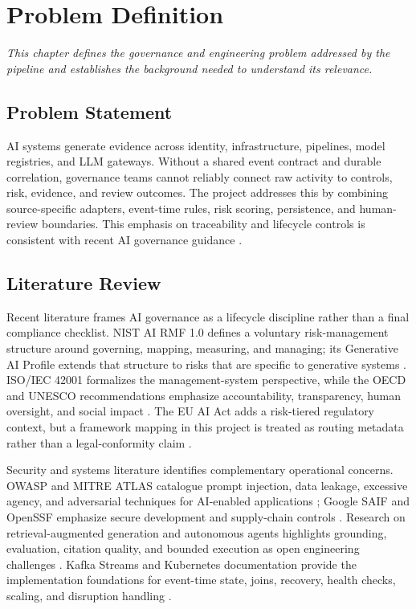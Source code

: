 \documentclass[12pt,oneside]{report}
\begin{document}
\chapter{Problem Definition}
\noindent\textit{This chapter defines the governance and engineering problem addressed by the pipeline and establishes the background needed to understand its relevance.}\par
\section{Problem Statement}
AI systems generate evidence across identity, infrastructure, pipelines, model registries, and LLM gateways. Without a shared event contract and durable correlation, governance teams cannot reliably connect raw activity to controls, risk, evidence, and review outcomes. The project addresses this by combining source-specific adapters, event-time rules, risk scoring, persistence, and human-review boundaries. This emphasis on traceability and lifecycle controls is consistent with recent AI governance guidance \cite{nist2023,iso42001,euaiact2024,owasllm2025}.
\section{Literature Review}
Recent literature frames AI governance as a lifecycle discipline rather than a final compliance checklist. NIST AI RMF 1.0 defines a voluntary risk-management structure around governing, mapping, measuring, and managing; its Generative AI Profile extends that structure to risks that are specific to generative systems \cite{nist2023,nistgenai2024}. ISO/IEC 42001 formalizes the management-system perspective, while the OECD and UNESCO recommendations emphasize accountability, transparency, human oversight, and social impact \cite{iso42001,oecd2024,unesco2021}. The EU AI Act adds a risk-tiered regulatory context, but a framework mapping in this project is treated as routing metadata rather than a legal-conformity claim \cite{euaiact2024}.

Security and systems literature identifies complementary operational concerns. OWASP and MITRE ATLAS catalogue prompt injection, data leakage, excessive agency, and adversarial techniques for AI-enabled applications \cite{owasllm2025,mitreatlas2024}; Google SAIF and OpenSSF emphasize secure development and supply-chain controls \cite{google2023,openssf2024}. Research on retrieval-augmented generation and autonomous agents highlights grounding, evaluation, citation quality, and bounded execution as open engineering challenges \cite{ragsurvey2024,agentsurvey2024}. Kafka Streams and Kubernetes documentation provide the implementation foundations for event-time state, joins, recovery, health checks, scaling, and disruption handling \cite{kafkastreams2024,kubernetes2024}.
\end{document}
